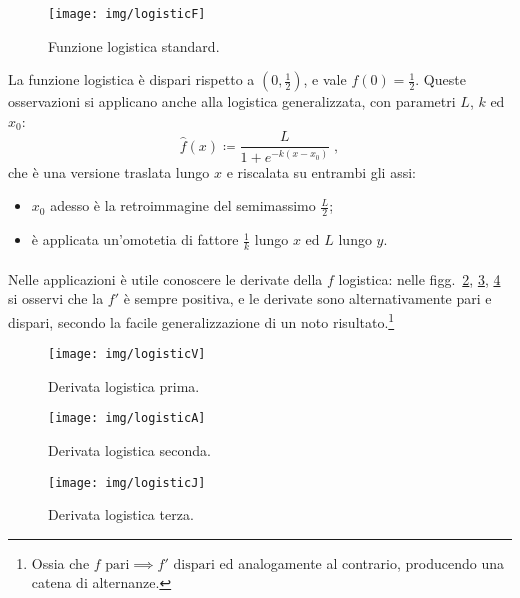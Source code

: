 \begin{figure}[pbh]
    \centering
    \texttt{[image: img/logisticF]}

    \caption[Funzione logistica]{Funzione logistica standard.}
    \label{img:logisticF}
\end{figure}

La funzione logistica è dispari rispetto a $(0, \frac{1}{2})$, e vale $f(0) = \frac{1}{2}$.
Queste osservazioni si applicano anche alla logistica generalizzata, con parametri $L$, $k$ ed $x_0$:
\begin{equation}
    \hat{f}(x) \coloneq \frac{L}{1+e^{-k(x -x_0)}} \; ,
    \label{eq:logisticFgen}
\end{equation}
che è una versione traslata lungo $x$ e riscalata su entrambi gli assi:
\begin{itemize}
    \item $x_0$ adesso è la retroimmagine del semimassimo $\frac{L}{2}$;
    \item è applicata un'omotetia di fattore $\frac{1}{k}$ lungo $x$ ed $L$ lungo $y$.
\end{itemize}

\paragraph{}
Nelle applicazioni è utile conoscere le derivate della $f$ logistica:
nelle figg.~\ref{img:logisticV}, \ref{img:logisticA}, \ref{img:logisticJ} si osservi che
la $f'$ è sempre positiva, e le derivate sono alternativamente pari e dispari, secondo la
facile generalizzazione di un noto risultato.\footnote{Ossia che $f \text{ pari} \implies
    f' \text{ dispari}$ ed analogamente al contrario,
producendo una catena di alternanze.}

\begin{figure}[pbh]
    \centering
    \texttt{[image: img/logisticV]}

    \caption{Derivata logistica prima.}
    \label{img:logisticV}
\end{figure}
\begin{figure}[pbh]
    \centering
    \texttt{[image: img/logisticA]}

    \caption{Derivata logistica seconda.}
    \label{img:logisticA}
\end{figure}
\begin{figure}[pbh]
    \centering
    \texttt{[image: img/logisticJ]}

    \caption{Derivata logistica terza.}
    \label{img:logisticJ}
\end{figure}

